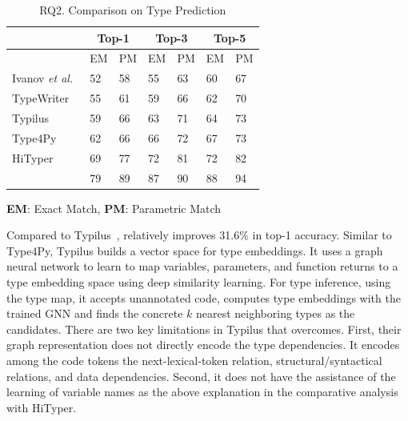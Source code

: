 \begin{table}[t]%
  \caption{RQ2. Comparison on Type Prediction}
  \vspace{-7pt}
	\begin{center}
		\small
		\renewcommand{\arraystretch}{1} \begin{tabular}{|p{1.9cm}<{\centering}|p{0.65cm}<{\centering}|p{0.65cm}<{\centering}|p{0.65cm}<{\centering}|p{0.65cm}<{\centering}|p{0.65cm}<{\centering}|p{0.65cm}<{\centering}|}
			
			\hline
                       & \multicolumn{2}{c|}{Top-1}         & \multicolumn{2}{c|}{Top-3}         & \multicolumn{2}{c|}{Top-5} \\
			\hline
                       & EM & PM & EM & PM & EM & PM  \\ 
			\hline
		        Ivanov {\em et al.}~\cite{ivanov21predicting} &  52    & 58     &   55   &  63     &  60     &   67    \\
			TypeWriter~\cite{typewriter-fse20}  &   55   &  61    &  59    &   66   &  62    &  70     \\
			Typilus~\cite{typilus-pldi20}  &   59   &  66    &  63    &  71    &  64    & 73      \\
                       	Type4Py~\cite{Type4Py-icse22}  & 62 & 66 & 66 & 72 & 67 & 73 \\
                        HiTyper~\cite{HiTyper-icse22}  & 69 & 77 & 72 & 81 & 72 & 82 \\
			\hline
			{\bf {\tool}}                        & 79 & 89 & 87 & 90 & 88 & 94 \\
			\hline
		\end{tabular}
		\label{type-result}
		{\bf EM}: Exact Match, {\bf PM}: Parametric Match
	\end{center}
\end{table}

Compared to Typilus~\cite{typilus-pldi20}, {\tool} relatively improves
31.6\% in top-1 accuracy. Similar to Type4Py, Typilus builds a vector
space for type embeddings. It uses a graph neural network to learn to
map variables, parameters, and function returns to a type embedding
space using deep similarity learning. For type inference, using the
type map, it accepts unannotated code, computes type embeddings with
the trained GNN and finds the concrete $k$ nearest neighboring types
as the candidates. There are two key limitations in Typilus that
{\tool} overcomes. First, their graph representation does not directly
encode the type dependencies. It encodes among the code tokens the
next-lexical-token relation, structural/syntactical relations, and
data dependencies. Second, it does not have the assistance of the
learning of variable names as the above explanation in the comparative
analysis with HiTyper.

